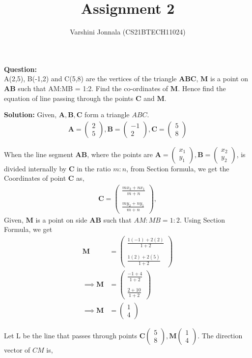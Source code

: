 \documentclass[journal,12pt,twocolumn]{IEEEtran}
\title{Assignment 2}
\author{Varshini Jonnala (CS21BTECH11024)}
\let\vec\mathbf
\newcommand{\myvec}[1]{\ensuremath{\begin{pmatrix}#1\end{pmatrix}}}
\begin{document}
    \maketitle
    \textbf{Question: }\\
      A(2,5), B(-1,2) and C(5,8) are the vertices of the triangle $\vec{ABC}$, $\vec{M}$ is a point on $\vec{AB}$ such that AM:MB = 1:2. Find the co-ordinates of $\vec{M}$. Hence find the equation of line passing through the points $\vec{C}$ and $\vec{M}$.


    \textbf{Solution: }
     Given, $\vec{A}, \vec{B}, \vec{C}$ form a triangle $ABC$.
	\begin{align}
		\vec{A} = \myvec{2 \\ 5} ,
		\vec{B} = \myvec{-1 \\ 2},
		\vec{C} = \myvec{5 \\ 8}
	\end{align}

    When the line segment $\vec{AB}$, where the points are $\vec{A}=\myvec{x_{1}\\y_{1}}, \vec{B}=\myvec{x_{2}\\y_{2}}$, is divided internally by $\vec{C}$ in the ratio $m:n$, from Section formula,
    we get the Coordinates of point $\vec{C}$ as,
    \begin{align} 
        \vec{C} = \myvec{\frac{mx_{2}+nx_{1}}{m+n}\\\\ \frac{my_{2}+ny_{1}}{m+n}},
    \end{align}	
    Given, $\vec{M}$ is a point on side $\vec{AB}$ such that $AM:MB = 1:2$. 
        Using Section Formula, we get
    \begin{align}
        \vec{M} &= \myvec{\frac{1(-1)+2(2)}{1+2}\\\\ \frac{1(2)+2(5)}{1+2}}\\
        \implies \vec{M} &= \myvec{\frac{-1+4}{1+2}\\\\ \frac{2+10}{1+2}}\\
        \implies \vec{M} &= \myvec{1\\4}
    \end{align}
    
    Let L be the line that passes through points $\vec{C}\myvec{5\\8}, \vec{M}\myvec{1\\4}$.
    The direction vector of $CM$ is,
    
\end{document}
